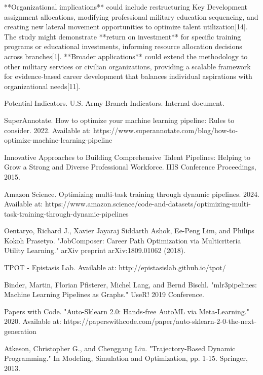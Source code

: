 \documentclass[main.tex]{subfiles}
\begin{document}
**Organizational implications** could include restructuring Key Development assignment allocations, modifying professional military education sequencing, and creating new lateral movement opportunities to optimize talent utilization[14]. The study might demonstrate **return on investment** for specific training programs or educational investments, informing resource allocation decisions across branches[1]. **Broader applications** could extend the methodology to other military services or civilian organizations, providing a scalable framework for evidence-based career development that balances individual aspirations with organizational needs[11].

\begin{thebibliography}{21}

Potential Indicators. U.S. Army Branch Indicators. Internal document.

SuperAnnotate. How to optimize your machine learning pipeline: Rules to consider. 2022. Available at: https://www.superannotate.com/blog/how-to-optimize-machine-learning-pipeline

Innovative Approaches to Building Comprehensive Talent Pipelines: Helping to Grow a Strong and Diverse Professional Workforce. IIIS Conference Proceedings, 2015.

Amazon Science. Optimizing multi-task training through dynamic pipelines. 2024. Available at: https://www.amazon.science/code-and-datasets/optimizing-multi-task-training-through-dynamic-pipelines

Oentaryo, Richard J., Xavier Jayaraj Siddarth Ashok, Ee-Peng Lim, and Philips Kokoh Prasetyo. "JobComposer: Career Path Optimization via Multicriteria Utility Learning." arXiv preprint arXiv:1809.01062 (2018).

TPOT - Epistasis Lab. Available at: http://epistasislab.github.io/tpot/

Binder, Martin, Florian Pfisterer, Michel Lang, and Bernd Bischl. "mlr3pipelines: Machine Learning Pipelines as Graphs." UseR! 2019 Conference.

Papers with Code. "Auto-Sklearn 2.0: Hands-free AutoML via Meta-Learning." 2020. Available at: https://paperswithcode.com/paper/auto-sklearn-2-0-the-next-generation

Atkeson, Christopher G., and Chenggang Liu. "Trajectory-Based Dynamic Programming." In Modeling, Simulation and Optimization, pp. 1-15. Springer, 2013.


\end{thebibliography}
\end{document}
